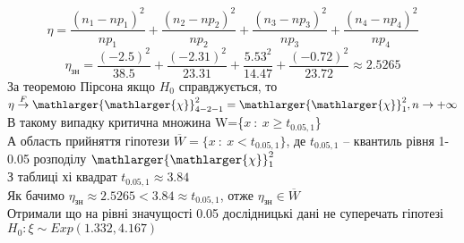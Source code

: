 \documentclass[11 pt]{article}
\begin{document}
$$
\eta = \frac{(n_1 - n p_1)^2}{n p_1} + \frac{(n_2 - n p_2)^2}{n p_2} + 
\frac{(n_3 - n p_3)^2}{n p_3} + \frac{(n_4 - n p_4)^2}{n p_4}
$$
$$
\eta_{\text{зн}} = \frac{(-2.5)^2}{38.5} + \frac{(-2.31)^2}{23.31} + 
\frac{5.53^2}{14.47} + \frac{(-0.72)^2}{23.72} \approx 2.5265
$$  
За теоремою Пірсона якщо $H_0 $ справджується, то  $\eta \stackrel{F}{\to} \mathlarger{\mathlarger{\chi}}^2_{4-2-1} = \mathlarger{\mathlarger{\chi}}^2_{1}, n \to +\infty$ \\ 
В такому випадку критична множина W=\{$x \ : \ x \geq t_{0.05, 1} $\} \\
А область прийняття гіпотези $\overline{W} = \{ x \ : \ x < t_{0.05, 1} \}$, 
де $t_{0.05, 1}$ -- квантиль рівня 1-0.05 розподілу $\mathlarger{\mathlarger{\chi}}^2_1$ \\ 
З таблиці хі квадрат $t_{0.05, 1} \approx 3.84$ \\ 
Як бачимо $\eta_\text{зн} \approx 2.5265 < 3.84 \approx t_{0.05, 1}$, отже $\eta_{\text{зн}} \in \overline{W}$ \\ 
Отримали що на рівні значущості 0.05 дослідницькі дані не суперечать гіпотезі $H_0 : \xi \sim Exp(1.332, 4.167)$   
\end{document}
